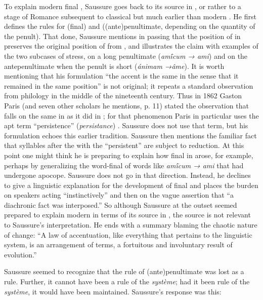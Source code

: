 \documentclass[output=paper,
modfonts
]{LSP/langsci}
\begin{document}
To explain modern  final , Saussure goes back to its source
in , or rather to a stage of Romance subsequent to classical 
but much earlier than modern . He first defines the  rules
for  (final) and  ((ante)penultimate, depending on the
quantity of the penult). That done, Saussure mentions in passing that
the position of  in  preserves the original position of
 from , and illustrates the claim with examples of the two
subcases of  stress, on a long penultimate (\emph{amī́cum → ami}) and 
on the antepenultimate when the penult is short
(\emph{ánimam →âme}). It is worth mentioning that his formulation
``the accent is the same in the sense that it remained in the same
position'' is not original; it repeats a standard observation from
 philology in the middle of the nineteenth century. Thus in 1862
Gaston Paris (and seven other scholars he mentions, p. 11) stated the
observation that  falls on the same  in  as it did
in ; for that phenomenon Paris in particular uses the apt term
``persistence'' (\emph{persistance}) \citep[28]{PA}. Saussure does not use
that term, but his formulation echoes this earlier tradition. Saussure
then mentions the familiar fact that syllables after the  with
the ``persistent''  are subject to  reduction. At this point one
might think he is preparing to explain how final  in  arose,
for example, perhaps by generalizing the word-final  of words like
\emph{amī́cum → ami} that had undergone apocope. Saussure does not
go in that direction. Instead, he declines to give a linguistic
explanation for the development of final  and places the burden on
speakers acting ``instinctively'' and then on the vague assertion that
``a diachronic fact was interposed.'' So although Saussure at the outset
seemed prepared to explain modern   in terms of its source
in , the source is not relevant to Saussure's interpretation. He
ends with a summary blaming the chaotic nature of change: ``A law of
accentuation, like everything that pertains to the linguistic system, is
an arrangement of terms, a fortuitous and involuntary result of
evolution.''

Saussure seemed to recognize that the  rule of (ante)penultimate
 was lost as a rule. Further, it cannot have been a rule of the
\emph{système}; had it been rule of the \emph{système}, it would have
been maintained. Saussure's response was this:
\end{document}
